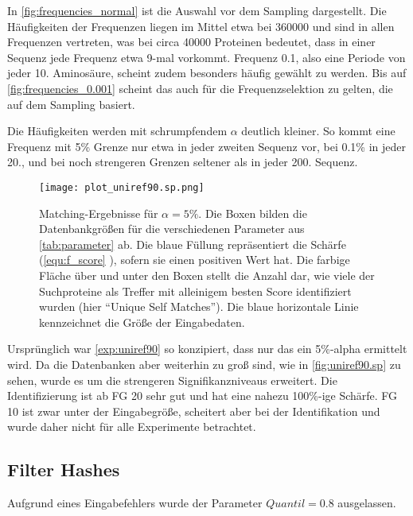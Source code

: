         In \autoref{fig:frequencies_normal} ist die Auswahl vor dem Sampling dargestellt. Die Häufigkeiten der Frequenzen liegen im Mittel etwa bei 360000 und sind in allen Frequenzen vertreten, was bei circa 40000 Proteinen bedeutet, dass in einer Sequenz jede Frequenz etwa 9-mal vorkommt. Frequenz 0.1, also eine Periode von jeder 10. Aminosäure, scheint zudem besonders häufig gewählt zu werden. Bis auf \autoref{fig:frequencies_0.001} scheint das auch für die Frequenzselektion zu gelten, die auf dem Sampling basiert.

        Die Häufigkeiten werden mit schrumpfendem $\alpha$ deutlich kleiner. So kommt eine Frequenz mit 5\% Grenze nur etwa in jeder zweiten Sequenz vor, bei 0.1\% in jeder 20., und bei noch strengeren Grenzen seltener als in jeder 200. Sequenz.

        \begin{figure}[H]
            \centering
            \texttt{[image: plot\_uniref90.sp.png]}
            \caption[Single-Protein-Matching ]{Matching-Ergebnisse für $\alpha=5\%$. Die Boxen bilden die Datenbankgrößen für die verschiedenen Parameter aus \autoref{tab:parameter} ab. Die blaue Füllung repräsentiert die Schärfe (\autoref{equ:f_score} ), sofern sie einen positiven Wert hat. Die farbige Fläche über und unter den Boxen stellt die Anzahl dar, wie viele der Suchproteine als Treffer mit alleinigem besten Score identifiziert wurden (hier ``Unique Self Matches''). Die blaue horizontale Linie kennzeichnet die Größe der Eingabedaten.}
            \label{fig:uniref90.sp}
        \end{figure}

        Ursprünglich war \autoref{exp:uniref90} so konzipiert, dass nur das ein 5\%-alpha ermittelt wird. Da die Datenbanken aber weiterhin zu groß sind, wie in \autoref{fig:uniref90.sp} zu sehen, wurde es um die strengeren Signifikanzniveaus erweitert. Die Identifizierung ist ab \ac{FG} 20 sehr gut und hat eine nahezu 100\%-ige Schärfe. \ac{FG} 10 ist zwar unter der Eingabegröße, scheitert aber bei der Identifikation und wurde daher nicht für alle Experimente betrachtet. 
    
    \subsection{Filter Hashes} %
        \label{sub:filter_results}
        Aufgrund eines Eingabefehlers wurde der Parameter $Quantil=0.8$ ausgelassen.

